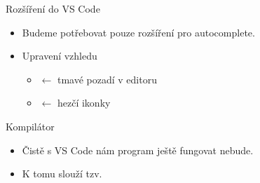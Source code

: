 \documentclass[14pt]{beamer}
\begin{document}
    \begin{frame}[t]{Rozšíření do VS Code}
        \begin{itemize}
            \item Budeme potřebovat pouze rozšíření  pro autocomplete.
            \item Upravení vzhledu
            \begin{itemize}
                \item {} $\leftarrow$ tmavé pozadí v editoru
                \item {} $\leftarrow$ hezčí ikonky 
            \end{itemize}
        \end{itemize}
    \end{frame}

    \begin{frame}[t]{Kompilátor}
        \begin{itemize}
            \item Čistě s VS Code nám program ještě fungovat nebude. 
        \end{itemize}
        \begin{center}
        \end{center}
        \begin{itemize}
            \item K tomu slouží tzv. 
        \end{itemize}
    \end{frame}
\end{document}
